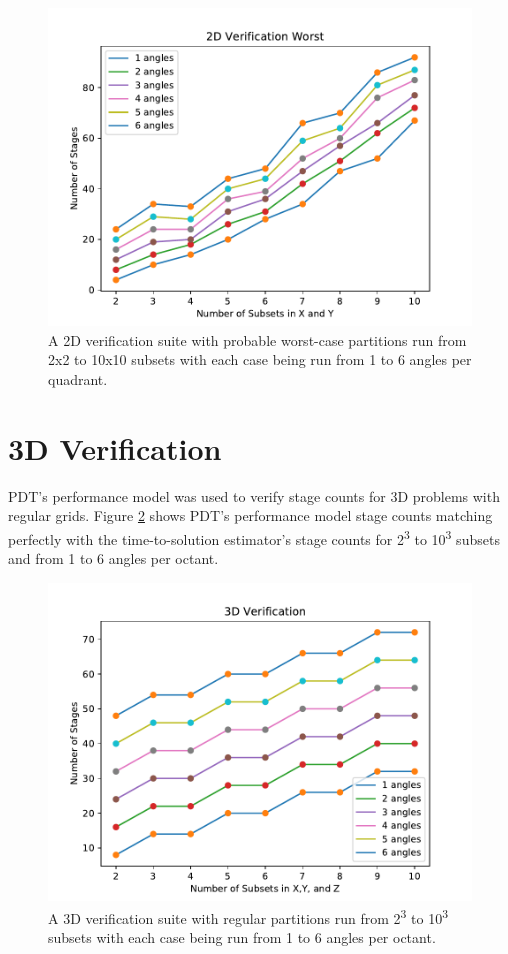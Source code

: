 \begin{figure}[H]
\centering
\includegraphics[scale=0.8]{../figures/worst_verification.pdf}
\caption{A 2D verification suite with probable worst-case partitions run from 2x2 to 10x10 subsets with each case being run from 1 to 6 angles per quadrant.}
\label{worst_verification}
\end{figure}

\section{3D Verification}

PDT's performance model was used to verify stage counts for 3D problems with regular grids. Figure \ref{3d_verification} shows PDT's performance model stage counts matching perfectly with the time-to-solution estimator's stage counts for 2\textsuperscript{3} to 10\textsuperscript{3} subsets and from 1 to 6 angles per octant.

\begin{figure}[H]
\centering
\includegraphics[scale=0.8]{../figures/3d_verification.pdf}
\caption{A 3D verification suite with regular partitions run from 2\textsuperscript{3} to 10\textsuperscript{3} subsets with each case being run from 1 to 6 angles per octant.}
\label{3d_verification}
\end{figure}


